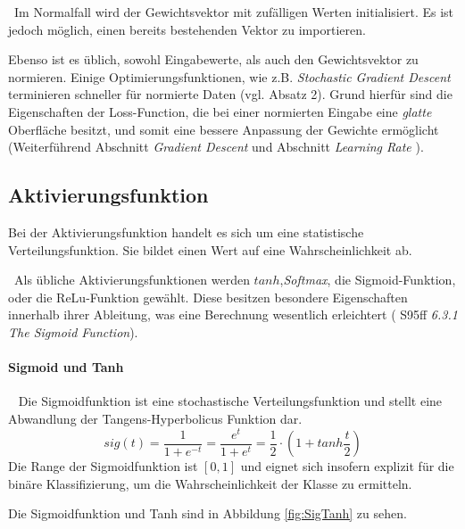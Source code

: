 ~\newline Im Normalfall wird der Gewichtsvektor mit zufälligen Werten initialisiert. Es ist jedoch möglich, einen bereits bestehenden Vektor zu importieren. 

Ebenso ist es üblich, sowohl Eingabewerte, als auch den Gewichtsvektor zu normieren. Einige Optimierungsfunktionen, wie z.B. \textit{Stochastic Gradient Descent} terminieren schneller für normierte Daten (vgl. \cite{GDQuora} Absatz 2). Grund hierfür sind die Eigenschaften der Loss-Function, die bei einer normierten Eingabe eine \textit{glatte} Oberfläche besitzt, und somit eine bessere Anpassung der Gewichte ermöglicht (Weiterführend \cite{GDBoost} Abschnitt \textit{Gradient Descent} und Abschnitt \textit{Learning Rate} ). 
\subsection{Aktivierungsfunktion}
\label{subsec:Aktivierungsfunktion} 
Bei der Aktivierungsfunktion handelt es sich um eine statistische Verteilungsfunktion. Sie bildet einen Wert auf eine Wahrscheinlichkeit ab. 

~\newline Als übliche Aktivierungsfunktionen werden $tanh$,\textit{Softmax}, die Sigmoid-Funktion, oder die ReLu-Funktion gewählt. Diese besitzen besondere Eigenschaften innerhalb ihrer Ableitung, was eine Berechnung wesentlich erleichtert (\cite{stroetmann} S95ff \textit{6.3.1 The Sigmoid Function}).

\paragraph{Sigmoid und Tanh}~\newline
Die Sigmoidfunktion ist eine stochastische Verteilungsfunktion und stellt eine Abwandlung der Tangens-Hyperbolicus Funktion dar. 
\begin{equation}
\label{eq:sigmoid}
sig(t) = \dfrac{1}{1+e^{-t}}=\dfrac{e^t}{1+ e^t}= \frac{1}{2} \cdot ( 1 + tanh \frac{t}{2})
\end{equation}
Die Range der Sigmoidfunktion ist $[0,1]$ und eignet sich insofern explizit für die binäre Klassifizierung, um die Wahrscheinlichkeit der Klasse zu ermitteln. 

Die Sigmoidfunktion und Tanh sind in Abbildung \ref{fig:SigTanh} zu sehen. 


